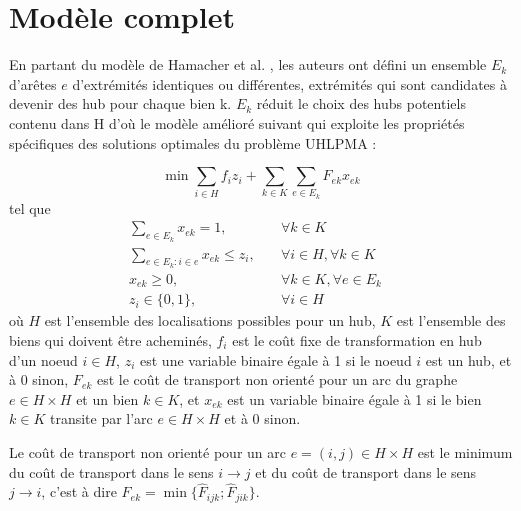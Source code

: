 \section{Modèle complet}

En partant du modèle de Hamacher et al. \cite[Adapting polyhedral properties from facility to hub location problems (2004)]{hln}, les auteurs ont défini un ensemble $E_k$ d'arêtes $e$ d'extrémités identiques ou différentes, extrémités qui sont candidates à devenir des hub pour chaque bien k. $E_k$ réduit le choix des hubs potentiels contenu dans H d'où le modèle amélioré suivant qui exploite les propriétés spécifiques des solutions optimales du problème UHLPMA : 

\[ \min \sum_{i \in H}f_iz_i + \sum_{k \in K}\sum_{e \in E_k}F_{ek}x_{ek}\]
tel que
\begin{subequations}
    \begin{align}
        \sum_{e \in E_k}x_{ek} = 1, \quad &\forall{k\in K}&\\
        \sum_{e \in E_k:i\in e}x_{ek} \le z_i,\quad &\forall{i \in H}, \forall{k\in K}&\\
        x_{ek} \ge 0, \quad &\forall{k \in K}, \forall{e \in E_k}&\\
        z_i\in \{0,1\},\quad &\forall{ i \in H}&
    \end{align}
\end{subequations}
 où $H$ est l'ensemble des localisations possibles pour un hub, $K$ est l'ensemble des biens qui doivent être acheminés, $f_i$ est le coût fixe de transformation en hub d'un noeud $i\in H$, $z_i$ est une variable binaire égale à 1 si le noeud $i$ est un hub, et à 0 sinon, $F_{ek}$ est le coût de transport non orienté pour un arc du graphe $e \in H\times H$ et un bien $k \in K$, et $x_{ek}$ est un variable binaire égale à 1 si le bien $k \in K$ transite par l'arc $e \in H\times H$ et à 0 sinon.
 
 Le coût de transport non orienté pour un arc $e = (i,j) \in H\times H$ est le minimum du coût de transport dans le sens $i \rightarrow j$ et du coût de transport dans le sens $j \rightarrow i$, c'est à dire $F_{ek} = \min \{ \hat{F}_{ijk};\hat{F}_{jik}\}$.


